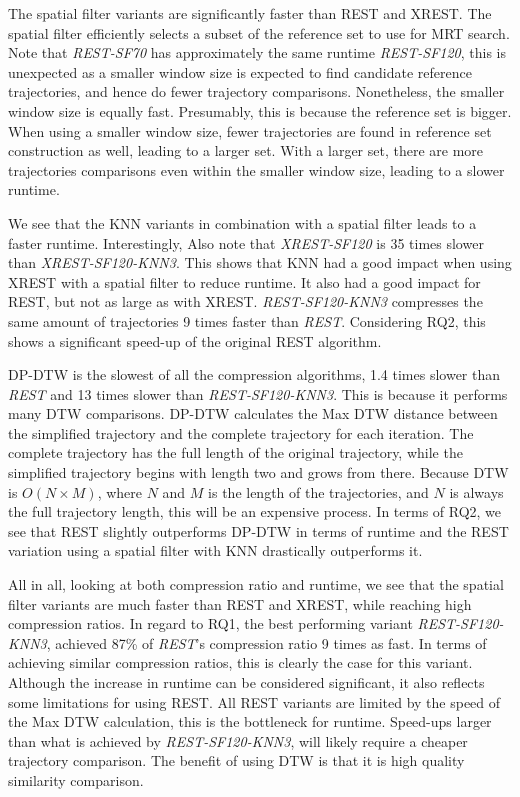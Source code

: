The spatial filter variants are significantly faster than REST and XREST. The spatial filter efficiently selects a subset of the reference set to use for MRT search. Note that \textit{REST-SF70} has approximately the same runtime \textit{REST-SF120}, this is unexpected as a smaller window size is expected to find candidate reference trajectories, and hence do fewer trajectory comparisons. Nonetheless, the smaller window size is equally fast. Presumably, this is because the reference set is bigger. When using a smaller window size, fewer trajectories are found in reference set construction as well, leading to a larger set. With a larger set, there are more trajectories comparisons even within the smaller window size, leading to a slower runtime.

We see that the KNN variants in combination with a spatial filter leads to a faster runtime. Interestingly, Also note that \textit{XREST-SF120} is 35 times slower than \textit{XREST-SF120-KNN3}. This shows that KNN had a good impact when using XREST with a spatial filter to reduce runtime. It also had a good impact for REST, but not as large as with XREST. \textit{REST-SF120-KNN3} compresses the same amount of trajectories 9 times faster than \textit{REST}. Considering RQ2, this shows a significant speed-up of the original REST algorithm.

DP-DTW is the slowest of all the compression algorithms, 1.4 times slower than \textit{REST} and 13 times slower than \textit{REST-SF120-KNN3}. This is because it performs many DTW comparisons. DP-DTW calculates the Max DTW distance between the simplified trajectory and the complete trajectory for each iteration. The complete trajectory has the full length of the original trajectory, while the simplified trajectory begins with length two and grows from there. Because DTW is $O(N \times M)$, where $N$ and $M$ is the length of the trajectories, and $N$ is always the full trajectory length, this will be an expensive process. In terms of RQ2, we see that REST slightly outperforms DP-DTW in terms of runtime and the REST variation using a spatial filter with KNN drastically outperforms it.

All in all, looking at both compression ratio and runtime, we see that the spatial filter variants are much faster than REST and XREST, while reaching high compression ratios. In regard to RQ1, the best performing variant \textit{REST-SF120-KNN3}, achieved 87\% of \textit{REST}'s compression ratio 9 times as fast. In terms of achieving similar compression ratios, this is clearly the case for this variant. Although the increase in runtime can be considered significant, it also reflects some limitations for using REST. All REST variants are limited by the speed of the Max DTW calculation, this is the bottleneck for runtime. Speed-ups larger than what is achieved by \textit{REST-SF120-KNN3}, will likely require a cheaper trajectory comparison. The benefit of using DTW is that it is high quality similarity comparison.


